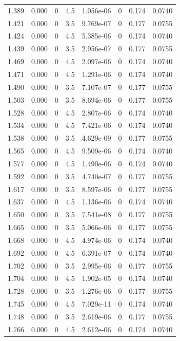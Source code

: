 \documentclass[preview]{standalone}
\begin{document}
{{{{\begin{tabular}{L{1.2cm}C{1.2cm} C{0.3cm}C{0.5cm} C{1.4cm}C{1.4cm} C{1.4cm}C{1.4cm}}
  1.389  &  0.000  & 0     & 4.5 &  1.056e-06  & 0  & 0.174 &  0.0740   \\ 
  1.421  &  0.000  & 0     & 3.5 &  9.769e-07  & 0  & 0.177 &  0.0755   \\ 
  1.424  &  0.000  & 0     & 4.5 &  5.385e-06  & 0  & 0.174 &  0.0740   \\ 
  1.439  &  0.000  & 0     & 3.5 &  2.956e-07  & 0  & 0.177 &  0.0755   \\ 
  1.469  &  0.000  & 0     & 4.5 &  2.097e-06  & 0  & 0.174 &  0.0740   \\ 
  1.471  &  0.000  & 0     & 4.5 &  1.291e-06  & 0  & 0.174 &  0.0740   \\ 
  1.490  &  0.000  & 0     & 3.5 &  7.107e-07  & 0  & 0.177 &  0.0755   \\ 
  1.503  &  0.000  & 0     & 3.5 &  8.694e-06  & 0  & 0.177 &  0.0755   \\ 
  1.528  &  0.000  & 0     & 4.5 &  2.807e-06  & 0  & 0.174 &  0.0740   \\ 
  1.534  &  0.000  & 0     & 4.5 &  7.421e-06  & 0  & 0.174 &  0.0740   \\ 
  1.538  &  0.000  & 0     & 3.5 &  4.629e-09  & 0  & 0.177 &  0.0755   \\ 
  1.565  &  0.000  & 0     & 4.5 &  9.509e-06  & 0  & 0.174 &  0.0740   \\ 
  1.577  &  0.000  & 0     & 4.5 &  1.490e-06  & 0  & 0.174 &  0.0740   \\ 
  1.592  &  0.000  & 0     & 3.5 &  4.740e-07  & 0  & 0.177 &  0.0755   \\ 
  1.617  &  0.000  & 0     & 3.5 &  8.597e-06  & 0  & 0.177 &  0.0755   \\ 
  1.637  &  0.000  & 0     & 4.5 &  1.136e-06  & 0  & 0.174 &  0.0740   \\ 
  1.650  &  0.000  & 0     & 3.5 &  7.541e-08  & 0  & 0.177 &  0.0755   \\ 
  1.665  &  0.000  & 0     & 3.5 &  5.066e-06  & 0  & 0.177 &  0.0755   \\ 
  1.668  &  0.000  & 0     & 4.5 &  4.974e-06  & 0  & 0.174 &  0.0740   \\ 
  1.692  &  0.000  & 0     & 4.5 &  6.391e-07  & 0  & 0.174 &  0.0740   \\ 
  1.702  &  0.000  & 0     & 3.5 &  2.995e-06  & 0  & 0.177 &  0.0755   \\ 
  1.704  &  0.000  & 0     & 4.5 &  1.902e-05  & 0  & 0.174 &  0.0740   \\ 
  1.728  &  0.000  & 0     & 3.5 &  1.276e-06  & 0  & 0.177 &  0.0755   \\ 
  1.745  &  0.000  & 0     & 4.5 &  7.029e-11  & 0  & 0.174 &  0.0740   \\ 
  1.748  &  0.000  & 0     & 3.5 &  2.619e-06  & 0  & 0.177 &  0.0755   \\ 
  1.766  &  0.000  & 0     & 4.5 &  2.612e-06  & 0  & 0.174 &  0.0740   \\ 
\hline 
\end{tabular} 

}}}}
\end{document}
